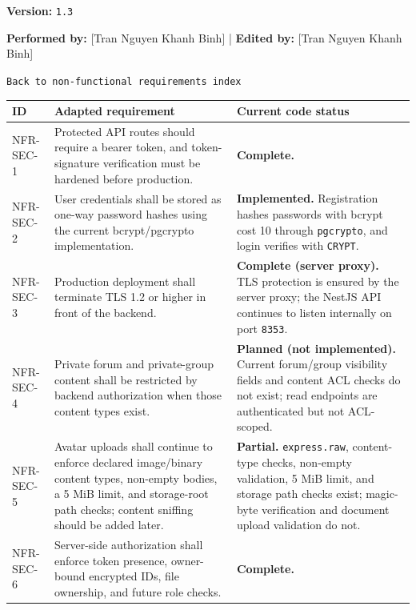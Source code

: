 \documentclass[12pt]{article}
\renewcommand{\baselinestretch}{1.5}
\begin{document}
\textbf{Version:} \texttt{1.3}
\par\medskip

\textbf{Performed by:} [Tran Nguyen Khanh Binh] | \textbf{Edited by:} [Tran Nguyen Khanh Binh]
\par\medskip

\texttt{Back to non-functional requirements index}
\par\medskip

\begingroup
\small
\renewcommand{\baselinestretch}{1.0}\selectfont
\renewcommand{\arraystretch}{1.15}
\setlength{\tabcolsep}{6pt}
\begin{longtable}{|>{\raggedright\arraybackslash}p{}|>{\raggedright\arraybackslash}p{}|>{\raggedright\arraybackslash}p{}|}
\hline
\textbf{ID} & \textbf{Adapted requirement} & \textbf{Current code status} \\ \hline
\endhead
NFR-SEC-1 & Protected API routes should require a bearer token, and token-signature verification must be hardened before production. & \textbf{Complete.} \\ \hline
NFR-SEC-2 & User credentials shall be stored as one-way password hashes using the current bcrypt/pgcrypto implementation. & \textbf{Implemented.} Registration hashes passwords with bcrypt cost 10 through \texttt{pgcrypto}, and login verifies with \texttt{CRYPT}. \\ \hline
NFR-SEC-3 & Production deployment shall terminate TLS 1.2 or higher in front of the backend. & \textbf{Complete (server proxy).} TLS protection is ensured by the server proxy; the NestJS API continues to listen internally on port \texttt{8353}. \\ \hline
NFR-SEC-4 & Private forum and private-group content shall be restricted by backend authorization when those content types exist. & \textbf{Planned (not implemented).} Current forum/group visibility fields and content ACL checks do not exist; read endpoints are authenticated but not ACL-scoped. \\ \hline
NFR-SEC-5 & Avatar uploads shall continue to enforce declared image/binary content types, non-empty bodies, a 5 MiB limit, and storage-root path checks; content sniffing should be added later. & \textbf{Partial.} \texttt{express.raw}, content-type checks, non-empty validation, 5 MiB limit, and storage path checks exist; magic-byte verification and document upload validation do not. \\ \hline
NFR-SEC-6 & Server-side authorization shall enforce token presence, owner-bound encrypted IDs, file ownership, and future role checks. & \textbf{Complete.} \\ \hline

\end{longtable}
\end{document}
